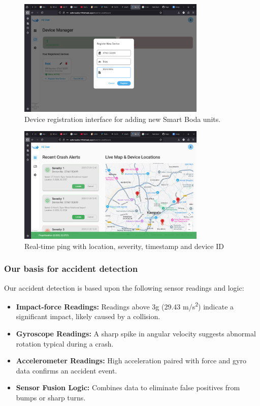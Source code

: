 \documentclass[12pt]{article}
\begin{document}
\begin{figure}[H]
  \centering
  \includegraphics[width=0.8\textwidth]{Device Registration.png}
  \caption{Device registration interface for adding new Smart Boda units.}
  \label{fig:registration}
\end{figure}

\begin{figure}[H]
  \centering
  \includegraphics[width=0.8\textwidth]{Realtime.png}
  \caption{Real-time ping with location, severity, timestamp and device ID}
  \label{fig:realtime}
\end{figure}

\subsubsection{Our basis for accident detection}
Our accident detection is based upon the following sensor readings and logic:

\begin{itemize}
  \item \textbf{Impact-force Readings:} Readings above 3g (29.43 m/s\textsuperscript{2}) indicate a significant impact, likely caused by a collision.
  \item \textbf{Gyroscope Readings:} A sharp spike in angular velocity suggests abnormal rotation typical during a crash.
  \item \textbf{Accelerometer Readings:} High acceleration paired with force and gyro data confirms an accident event.
  \item \textbf{Sensor Fusion Logic:} Combines data to eliminate false positives from bumps or sharp turns.
\end{itemize}
\end{document}
